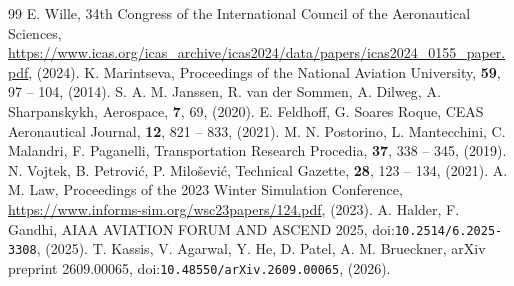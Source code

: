 \begin{thebibliography}{99}
 E. Wille, 34th Congress of the International Council of the Aeronautical Sciences, \url{https://www.icas.org/icas_archive/icas2024/data/papers/icas2024_0155_paper.pdf}, (2024).
 K. Marintseva, Proceedings of the National Aviation University, \textbf{59}, 97 -- 104, (2014).
 S. A. M. Janssen, R. van der Sommen, A. Dilweg, A. Sharpanskykh, Aerospace, \textbf{7}, 69, (2020).
 E. Feldhoff, G. Soares Roque, CEAS Aeronautical Journal, \textbf{12}, 821 -- 833, (2021).
 M. N. Postorino, L. Mantecchini, C. Malandri, F. Paganelli, Transportation Research Procedia, \textbf{37}, 338 -- 345, (2019).
 N. Vojtek, B. Petrovi{\'c}, P. Milo{\v s}evi{\'c}, Technical Gazette, \textbf{28}, 123 -- 134, (2021).
 A. M. Law, Proceedings of the 2023 Winter Simulation Conference, \url{https://www.informs-sim.org/wsc23papers/124.pdf}, (2023).
 A. Halder, F. Gandhi, AIAA AVIATION FORUM AND ASCEND 2025, doi:\nolinkurl{10.2514/6.2025-3308}, (2025).
 T. Kassis, V. Agarwal, Y. He, D. Patel, A. M. Brueckner, arXiv preprint 2609.00065, doi:\nolinkurl{10.48550/arXiv.2609.00065}, (2026).
\end{thebibliography}
